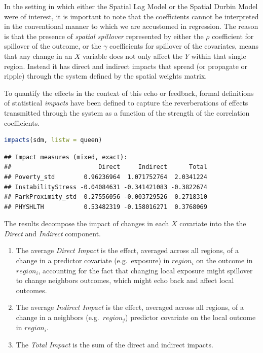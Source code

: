\documentclass[
]{book}
\providecommand{\tightlist}{%
  \setlength{\itemsep}{0pt}\setlength{\parskip}{0pt}}
\begin{document}
In the setting in which either the Spatial Lag Model or the Spatial Durbin Model were of interest, it is important to note that the coefficients cannot be interpreted in the conventional manner to which we are accustomed in regression. The reason is that the presence of \emph{spatial spillover} represented by either the \(\rho\) coefficient for spillover of the outcome, or the \(\gamma\) coefficients for spillover of the covariates, means that any change in an \(X\) variable does not only affect the \(Y\) within that single region. Instead it has direct and indirect impacts that spread (or propagate or ripple) through the system defined by the spatial weights matrix.

To quantify the effects in the context of this echo or feedback, formal definitions of statistical \emph{impacts} have been defined to capture the reverberations of effects transmitted through the system as a function of the strength of the correlation coefficients.

\begin{lstlisting}[language=R]
impacts(sdm, listw = queen)
\end{lstlisting}

\begin{lstlisting}
## Impact measures (mixed, exact):
##                        Direct     Indirect      Total
## Poverty_std        0.96236964  1.071752764  2.0341224
## InstabilityStress -0.04084631 -0.341421083 -0.3822674
## ParkProximity_std  0.27556056 -0.003729526  0.2718310
## PHYSHLTH           0.53482319 -0.158016271  0.3768069
\end{lstlisting}

The results decompose the impact of changes in each \(X\) covariate into the the \emph{Direct} and \emph{Indirect} component.

\begin{enumerate}
\def\labelenumi{\arabic{enumi}.}
\tightlist
\item
  The average \emph{Direct Impact} is the effect, averaged across all regions, of a change in a predictor covariate (e.g.~exposure) in \(region_i\) on the outcome in \(region_i\), accounting for the fact that changing local exposure might spillover to change neighbors outcomes, which might echo back and affect local outcomes.
\item
  The average \emph{Indirect Impact} is the effect, averaged across all regions, of a change in a neighbors (e.g.~\(region_j\)) predictor covariate on the local outcome in \(region_i\).
\item
  The \emph{Total Impact} is the sum of the direct and indirect impacts.
\end{enumerate}
\end{document}
